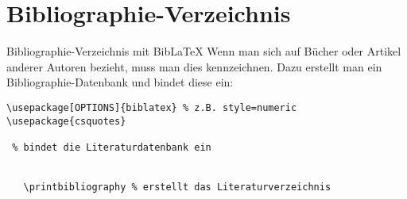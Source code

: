 \section{Bibliographie-Verzeichnis}
\begin{frame}[fragile]{Bibliographie-Verzeichnis mit Bib\LaTeX}
Wenn man sich auf Bücher oder Artikel anderer Autoren bezieht, muss man dies kennzeichnen. Dazu erstellt man ein Bibliographie-Datenbank und bindet diese ein:
\begin{lstlisting}[style=tex]
\usepackage[OPTIONS]{biblatex} % z.B. style=numeric
\usepackage{csquotes}

 % bindet die Literaturdatenbank ein


   \printbibliography % erstellt das Literaturverzeichnis

\end{lstlisting}
\end{frame}

